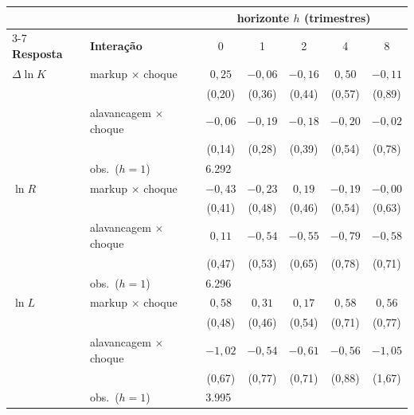 \begin{tabular}{llccccc}
\toprule
& & \multicolumn{5}{c}{horizonte $h$ (trimestres)} \\
\cmidrule(lr){3-7}
\textbf{Resposta} & \textbf{Interação} & 0 & 1 & 2 & 4 & 8 \\
\midrule
$\Delta\ln K$ & markup $\times$ choque & $0{,}25$ & $-0{,}06$ & $-0{,}16$ & $0{,}50$ & $-0{,}11$ \\
 &  & {\footnotesize (0{,}20)} & {\footnotesize (0{,}36)} & {\footnotesize (0{,}44)} & {\footnotesize (0{,}57)} & {\footnotesize (0{,}89)} \\
 & alavancagem $\times$ choque & $-0{,}06$ & $-0{,}19$ & $-0{,}18$ & $-0{,}20$ & $-0{,}02$ \\
 &  & {\footnotesize (0{,}14)} & {\footnotesize (0{,}28)} & {\footnotesize (0{,}39)} & {\footnotesize (0{,}54)} & {\footnotesize (0{,}78)} \\
& {\footnotesize obs.\ ($h=1$)} & \multicolumn{5}{l}{{\footnotesize 6.292}} \\
\addlinespace
$\ln R$ & markup $\times$ choque & $-0{,}43$ & $-0{,}23$ & $0{,}19$ & $-0{,}19$ & $-0{,}00$ \\
 &  & {\footnotesize (0{,}41)} & {\footnotesize (0{,}48)} & {\footnotesize (0{,}46)} & {\footnotesize (0{,}54)} & {\footnotesize (0{,}63)} \\
 & alavancagem $\times$ choque & $0{,}11$ & $-0{,}54$ & $-0{,}55$ & $-0{,}79$ & $-0{,}58$ \\
 &  & {\footnotesize (0{,}47)} & {\footnotesize (0{,}53)} & {\footnotesize (0{,}65)} & {\footnotesize (0{,}78)} & {\footnotesize (0{,}71)} \\
& {\footnotesize obs.\ ($h=1$)} & \multicolumn{5}{l}{{\footnotesize 6.296}} \\
\addlinespace
$\ln L$ & markup $\times$ choque & $0{,}58$ & $0{,}31$ & $0{,}17$ & $0{,}58$ & $0{,}56$ \\
 &  & {\footnotesize (0{,}48)} & {\footnotesize (0{,}46)} & {\footnotesize (0{,}54)} & {\footnotesize (0{,}71)} & {\footnotesize (0{,}77)} \\
 & alavancagem $\times$ choque & $-1{,}02$ & $-0{,}54$ & $-0{,}61$ & $-0{,}56$ & $-1{,}05$ \\
 &  & {\footnotesize (0{,}67)} & {\footnotesize (0{,}77)} & {\footnotesize (0{,}71)} & {\footnotesize (0{,}88)} & {\footnotesize (1{,}67)} \\
& {\footnotesize obs.\ ($h=1$)} & \multicolumn{5}{l}{{\footnotesize 3.995}} \\
\bottomrule
\end{tabular}